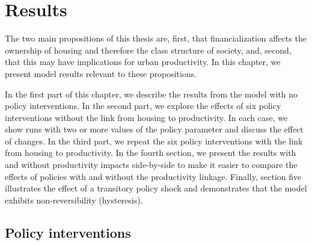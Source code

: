 \chapter{Results} \label{chapter-results}

The two main propositions of this thesis are, first, that financialization affects the ownership of housing and therefore the class structure of society, and, second, that this may have implications for urban productivity.  In this chapter, we present model results relevant to these propositions.

In the first part of this chapter, we describe the results from the model with no policy interventions. In the second part, we explore the effects of six policy interventions without the link from housing to productivity. In each case, we show runs with two or more values of the policy parameter and discuss the effect of changes. In the third part, we repeat the six policy interventions with the link from housing to productivity.  %
In the fourth section, we present the results with and without productivity impacts side-by-side to make it easier to compare the effects of policies with and without the productivity linkage. Finally, section five illustrates the effect of a transitory policy shock and demonstrates that the model exhibits non-reversibility (hysteresis). 

\section{Policy interventions}

